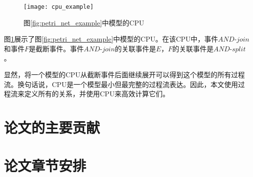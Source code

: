 \begin{figure}[htbp]
  \centering
  \texttt{[image: cpu\_example]}
  \caption{图\ref{fig:petri_net_example}中模型的CPU\label{fig:cpu_example}}
\end{figure}

图\ref{fig:cpu_example}展示了图\ref{fig:petri_net_example}中模型的CPU。在该CPU中，事件$AND$-$join$和事件$F$是截断事件。事件$AND$-$join$的关联事件是$E$，$F$的关联事件是$AND$-$split$。

显然，将一个模型的CPU从截断事件后面继续展开可以得到这个模型的所有过程流。换句话说，CPU是一个模型最小但最完整的过程流表达。因此，本文使用过程流来定义所有的关系，并使用CPU来高效计算它们。

\section{论文的主要贡献}\label{sec:contribution}

\section{论文章节安排}\label{sec:structure}